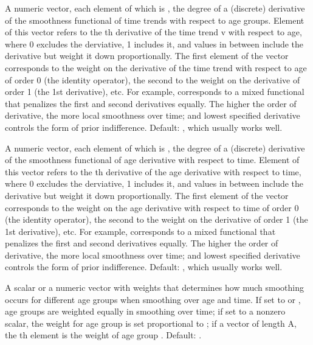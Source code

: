 \begin{Arguments}
\begin{ldescription}
\item[\code{Hat.a.deriv}] A numeric vector, each element of which is , the degree of a (discrete) derivative of the
smoothness functional of time trends with respect to age
groups. Element   of this vector refers to the th
derivative of the time trend v with respect to age, where 0 excludes
the derviative, 1 includes it, and values in between include the
derivative but weight it down proportionally. The first element of
the vector corresponds to the weight on the derivative of the time
trend with respect to age of order 0 (the identity operator), the
second to the weight on the derivative of order 1 (the 1st
derivative), etc. For example,  corresponds to a mixed
functional that penalizes the first and second derivatives
equally. The higher the order of derivative, the more local
smoothness over time; and lowest specified derivative controls the
form of prior indifference. Default: , which usually works
well.

\item[\code{Hat.t.deriv}] A numeric vector, each element of which is , the degree of a (discrete) derivative of the
smoothness functional of age derivative with respect to
time. Element  of this vector refers to the th
derivative of the age derivative with respect to time, where 0
excludes the derviative, 1 includes it, and values in between
include the derivative but weight it down proportionally. The first
element of the vector corresponds to the weight on the age
derivative with respect to time of order 0 (the identity operator),
the second to the weight on the derivative of order 1 (the 1st
derivative), etc. For example,  corresponds to a mixed
functional that penalizes the first and second derivatives
equally. The higher the order of derivative, the more local
smoothness over time; and lowest specified derivative controls the
form of prior indifference. Default: , which usually works
well.

\item[\code{Hat.age.weight}] A scalar or a numeric vector with weights that
determines how much smoothing occurs for different age groups when
smoothing over age and time. If set to  or , age groups are
weighted equally in smoothing over time; if set to a nonzero scalar,
the weight for age group  is set proportional to
; if a vector of length A, the th element is the
weight of age group . Default: .


\end{ldescription}
\end{Arguments}
